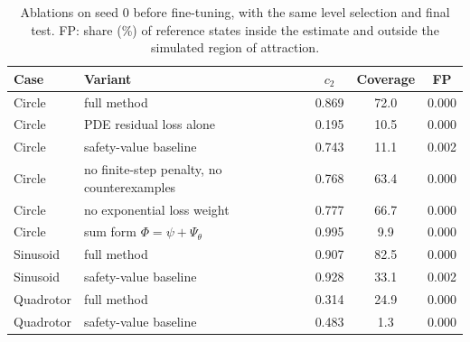 \begin{table}[t]
\centering\small
\caption{Ablations on seed 0 before fine-tuning, with the same level selection and final test. FP: share (\%) of reference states inside the estimate and outside the simulated region of attraction.}
\label{tab:ablation}
\begin{tabular}{llccc}
\toprule
Case & Variant & $c_2$ & Coverage & FP\\
\midrule
Circle & full method & 0.869 & 72.0 & 0.000\\
Circle & PDE residual loss alone & 0.195 & 10.5 & 0.000\\
Circle & safety-value baseline & 0.743 & 11.1 & 0.002\\
Circle & no finite-step penalty, no counterexamples & 0.768 & 63.4 & 0.000\\
Circle & no exponential loss weight & 0.777 & 66.7 & 0.000\\
Circle & sum form $\Phi=\psi+\Psi_\theta$ & 0.995 & 9.9 & 0.000\\
Sinusoid & full method & 0.907 & 82.5 & 0.000\\
Sinusoid & safety-value baseline & 0.928 & 33.1 & 0.002\\
Quadrotor & full method & 0.314 & 24.9 & 0.000\\
Quadrotor & safety-value baseline & 0.483 & 1.3 & 0.000\\
\bottomrule
\end{tabular}
\end{table}
